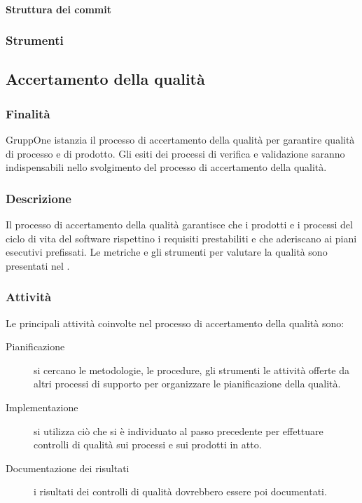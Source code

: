 \documentclass[../norme-di-progetto.tex]{subfiles}
\begin{document}
\paragraph{Struttura dei commit}%
\label{par:struttura_dei_commit}

\subsubsection{Strumenti}%
\label{subs:gestione_della_configurazione/strumenti}

\subsection{Accertamento della qualità}%
\label{subs:accertamento_della_qualita}

\subsubsection{Finalità}%
\label{subs:accertamento_della_qualita/finalita}

GruppOne istanzia il processo di accertamento della qualità per garantire qualità di processo e di prodotto.
Gli esiti dei processi di verifica e validazione saranno indispensabili nello svolgimento del processo di accertamento della qualità.

\subsubsection{Descrizione}%
\label{subs:accertamento_della_qualita/descrizione}

Il processo di accertamento della qualità garantisce che i prodotti e i processi del ciclo di vita del software rispettino i requisiti prestabiliti e che aderiscano ai piani esecutivi prefissati. Le metriche e gli strumenti per valutare la qualità sono presentati nel .

\subsubsection{Attività}%
\label{subs:accertamento_della_qualita/attivita}

Le principali attività coinvolte nel processo di accertamento della qualità sono:

\begin{description}
  \item [Pianificazione] si cercano le metodologie, le procedure, gli strumenti le attività offerte da altri processi di supporto per organizzare le pianificazione della qualità.
  \item [Implementazione] si utilizza ciò che si è individuato al passo precedente per effettuare controlli di qualità sui processi e sui prodotti in atto.
  \item [Documentazione dei risultati] i risultati dei controlli di qualità dovrebbero essere poi documentati.
\end{description}
\end{document}
